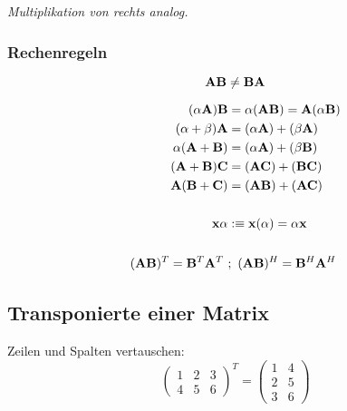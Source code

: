 		\textit{Multiplikation von rechts analog.}
		
		\subsubsection{Rechenregeln}
		
		\begin{frules}%
			
			\[
				\mathbf{A} \mathbf{B} \not= \mathbf{B} \mathbf{A}
			\]
			
			
			\begin{align*}
				(\alpha \mathbf{A})\mathbf{B} & = \alpha (\mathbf{A} \mathbf{B}) = \mathbf{A}(\alpha \mathbf{B}) \\
				(\alpha + \beta)\mathbf{A} & = (\alpha \mathbf{A}) + (\beta \mathbf{A}) \\
				\alpha(\mathbf{A} + \mathbf{B}) & = (\alpha \mathbf{A}) + (\beta \mathbf{B}) \\
				(\mathbf{A} + \mathbf{B})\mathbf{C} & = (\mathbf{A} \mathbf{C}) + (\mathbf{B} \mathbf{C}) \\
				\mathbf{A}(\mathbf{B} + \mathbf{C}) & = (\mathbf{A} \mathbf{B}) + (\mathbf{A} \mathbf{C}) \\
				\\
				\mathbf{x} \alpha & :\equiv \mathbf{x}(\alpha) = \alpha \mathbf{x} \\
				\\
				(\mathbf{A} \mathbf{B})^T = \mathbf{B}^T \mathbf{A}^T \ &; \ (\mathbf{A} \mathbf{B})^H = \mathbf{B}^H \mathbf{A}^H
			\end{align*}
	
		\end{frules}
	
	
	\subsection{Transponierte einer Matrix}
	
		\begin{fdef}[Normalfall $\mA^T$]
		
			Zeilen und Spalten vertauschen:
			\[
				\begin{pmatrix}
				        1 & 2 & 3\\
				        4 & 5 & 6
				\end{pmatrix}^T
				= 
				\begin{pmatrix}
					1 & 4\\
					2 & 5\\
					3 & 6
				\end{pmatrix}
			\]
			
		\end{fdef}
		
